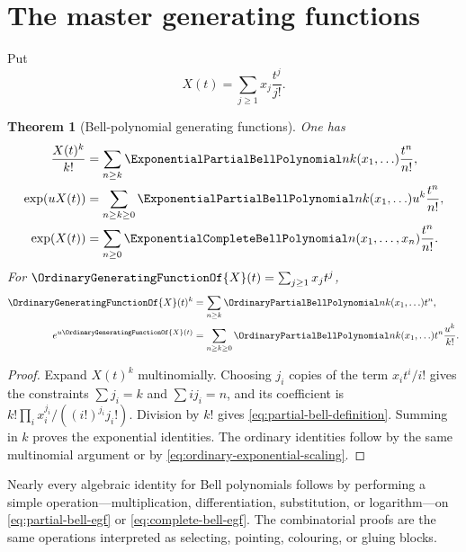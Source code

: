 \documentclass[11pt,a4paper,oneside,openany]{book}
\newtheorem{theorem}{Theorem}[chapter]
\theoremstyle{definition}
\theoremstyle{remark}
\begin{document}
\section{The master generating functions}
Put
\[
 X(t)=\sum_{j\ge1}x_j\frac{t^j}{j!}.
\]
\begin{theorem}[Bell-polynomial generating functions]\label{thm:bell-poly-egf}
One has
\begin{align}
 \frac{X(t)^k}{k!}
 &=\sum_{n\ge k}\ExponentialPartialBellPolynomial nk(x_1,\ldots)\frac{t^n}{n!},\\
 \exp(uX(t))
 &=\sum_{n\ge k\ge0}\ExponentialPartialBellPolynomial nk(x_1,\ldots)u^k\frac{t^n}{n!},\\
 \exp(X(t))
 &=\sum_{n\ge0}\ExponentialCompleteBellPolynomial n(x_1,\ldots,x_n)\frac{t^n}{n!}.
\end{align}
For $\OrdinaryGeneratingFunctionOf{X}(t)=\sum_{j\ge1}x_jt^j$,
\begin{align}
 \OrdinaryGeneratingFunctionOf{X}(t)^k&=\sum_{n\ge k}\OrdinaryPartialBellPolynomial nk(x_1,\ldots)t^n,
 \label{eq:ordinary-bell-ogf}\\
 e^{u\OrdinaryGeneratingFunctionOf{X}(t)}
 &=\sum_{n\ge k\ge0}\OrdinaryPartialBellPolynomial nk(x_1,\ldots)t^n\frac{u^k}{k!}.
 \label{eq:ordinary-bell-bivariate}
\end{align}
\end{theorem}
\begin{proof}
Expand $X(t)^k$ multinomially.  Choosing $j_i$ copies of the term
$x_it^i/i!$ gives the constraints $\sum j_i=k$ and $\sum ij_i=n$, and its
coefficient is $k!\prod_i x_i^{j_i}/((i!)^{j_i}j_i!)$.  Division by $k!$ gives
\eqref{eq:partial-bell-definition}.  Summing in $k$ proves the exponential
identities.  The ordinary identities follow by the same multinomial argument or
by \eqref{eq:ordinary-exponential-scaling}.
\end{proof}

\begin{masterbox}
Nearly every algebraic identity for Bell polynomials follows by performing a simple
operation---multiplication, differentiation, substitution, or logarithm---on
\eqref{eq:partial-bell-egf} or \eqref{eq:complete-bell-egf}.  The combinatorial
proofs are the same operations interpreted as selecting, pointing, colouring, or
gluing blocks.
\end{masterbox}
\end{document}
